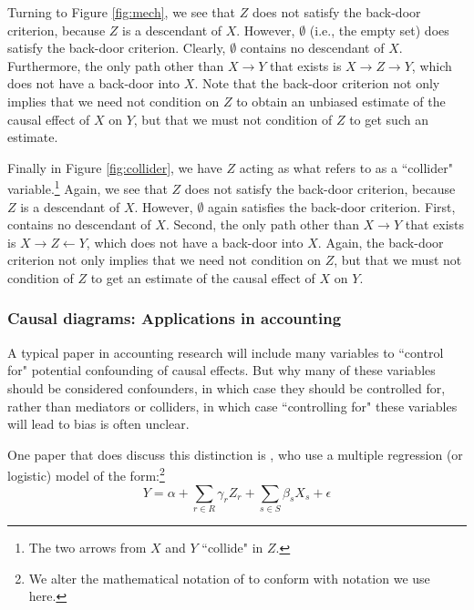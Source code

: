 \documentclass[11pt,reqno]{amsart}
\begin{document}
Turning to Figure \ref{fig:mech}, we see that $Z$ does not satisfy the back-door criterion, because $Z$ is a descendant of $X$.
However, $\emptyset$ (i.e., the empty set) does satisfy the back-door criterion.
Clearly, $\emptyset$ contains no descendant of $X$.
Furthermore, the only path other than $X \rightarrow Y$ that exists is $X \rightarrow Z \rightarrow Y$, which does not have a back-door into $X$.
Note that the back-door criterion not only implies that we need not condition on $Z$ to obtain an unbiased estimate of the causal effect of $X$ on $Y$, but that we must not condition of $Z$ to get such an estimate.

Finally in Figure \ref{fig:collider}, we have $Z$ acting as what \citep[p.\,17]{Pearl:2009kh} refers to as a ``collider" variable.\footnote{
The two arrows from $X$ and $Y$ ``collide" in $Z$.} 
Again, we see that $Z$ does not satisfy the back-door criterion, because $Z$ is a descendant of $X$.
However, $\emptyset$ again satisfies the back-door criterion.
First, contains no descendant of $X$.
Second, the only path other than $X \rightarrow Y$ that exists is $X \rightarrow Z \leftarrow Y$, which does not have a back-door into $X$.
Again, the back-door criterion not only implies that we need not condition on $Z$, but that we must not condition of $Z$ to get an estimate of the causal effect of $X$ on $Y$.

\subsubsection{Causal diagrams: Applications in accounting}
A typical paper in accounting research will include many variables  to ``control for" potential confounding of causal effects.
But why many of these variables should be considered confounders, in which case they should be controlled for, rather than mediators or colliders, in which case ``controlling for" these variables will lead to bias is often unclear.

One paper that does discuss this distinction is \citet{Larcker:2011bw}, who use a multiple regression (or logistic) model of the form:\footnote{We alter the mathematical notation of  \citet{Larcker:2011bw} to conform with notation we use here.}
\begin{equation}
Y = \alpha + \sum_{r \in R} \gamma _r Z_r + \sum_{s \in S} \beta_s X_s + \epsilon \label{eqn:lrt1}
\end{equation}
\end{document}
